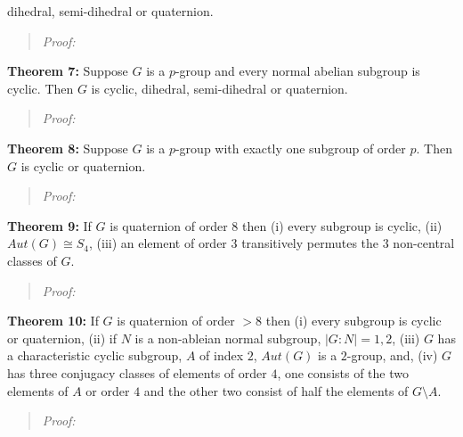 dihedral, semi-dihedral or quaternion.
\begin{quote}
\emph{Proof:}
\end{quote}
{\bf Theorem 7:} Suppose $G$ is a $p$-group and every normal abelian subgroup is cyclic.  Then $G$ is cyclic,
dihedral, semi-dihedral or quaternion.
\begin{quote}
\emph{Proof:}
\end{quote}
{\bf Theorem 8:} Suppose $G$ is a $p$-group with exactly one subgroup of order $p$. Then $G$ is cyclic or quaternion.
\begin{quote}
\emph{Proof:}
\end{quote}
{\bf Theorem 9:} If $G$ is quaternion of order $8$ then (i) every subgroup is cyclic, (ii) $Aut(G) \cong S_4$,
(iii) an element of order $3$ transitively permutes the $3$ non-central classes of $G$.
\begin{quote}
\emph{Proof:}
\end{quote}
{\bf Theorem 10:} If $G$ is quaternion of order $>8$ then (i) every subgroup is cyclic or quaternion,
(ii) if $N$ is a non-ableian normal subgroup, $|G:N| = 1, 2$,
(iii) $G$ has a characteristic cyclic subgroup, $A$ of index $2$,
$Aut(G)$ is a $2$-group, and,
(iv) $G$ has three conjugacy classes of elements of order $4$, one consists of the two elements of $A$ or order $4$
and the other two consist of half the elements of $G \setminus A$.
\begin{quote}
\emph{Proof:}
\end{quote}
